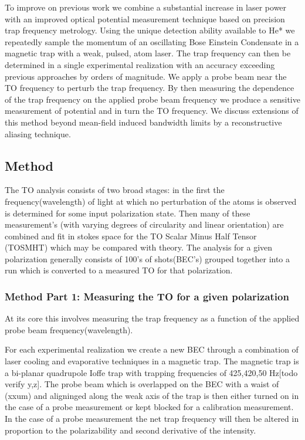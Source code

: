 \documentclass[aps,prl,
,reprint,
superscriptaddress,
onecolumn,
showpacs,preprintnumbers,
 amsmath,amssymb,
]{revtex4-1}
\begin{document}
To improve on previous work we combine a substantial increase in laser power with an improved optical potential measurement technique based on precision trap frequency metrology. Using the unique detection ability available to He* we repeatedly sample the momentum of an oscillating Bose Einstein Condensate in a magnetic trap with a weak, pulsed, atom laser. The trap frequency can then be determined in a single experimental realization with an accuracy exceeding previous approaches by orders of magnitude.
We apply a probe beam near the TO frequency to perturb the trap frequency.
By then measuring the dependence of the trap frequency on the applied probe beam frequency we produce a sensitive measurement of potential and in turn the TO frequency. We discuss extensions of this method beyond mean-field induced bandwidth limits by a reconstructive aliasing technique.

\subsection{Method}
The TO analysis consists of two broad stages: in the first the frequency(wavelength) of light at which no perturbation of the atoms is observed is determined for some input polarization state. Then many of these measurement's (with varying degrees of circularity and linear orientation) are combined and fit in stokes space for the TO Scalar Minus Half Tensor (TOSMHT) which may be compared with theory.
The analysis for a given polarization generally consists of 100's of shots(BEC's) grouped together into a run which is converted to a measured TO for that polarization.




\subsubsection{Method Part 1: Measuring the TO for a given polarization}
At its core this involves measuring the trap frequency as a function of the applied probe beam frequency(wavelength). 

For each experimental realization we create a new BEC through a combination of laser cooling and evaporative techniques in a magnetic trap. The magnetic trap is a bi-planar quadrupole Ioffe trap \cite{Dall2007a} with trapping frequencies of 425,420,50 Hz[todo verify y,z].
The probe beam which is overlapped on the BEC with a waist of (xxum) and aligninged along the weak axis of the trap is then either turned on in the case of a probe measurement or kept blocked for a calibration measurement. In the case of a probe measurement the net trap frequency will then be altered in proportion to the polarizability and second derivative of the intensity.
\end{document}
